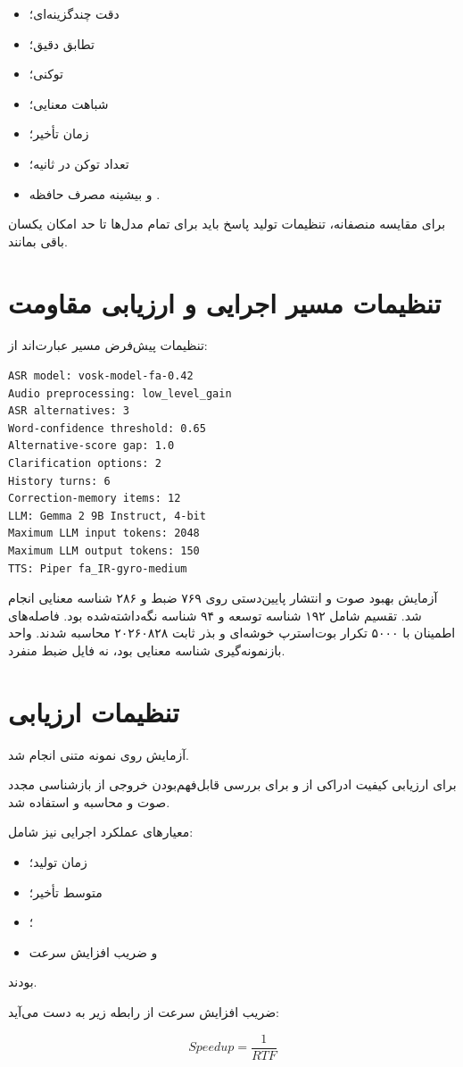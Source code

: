 \begin{itemize}
    \item دقت چندگزینه‌ای؛
    \item تطابق دقیق؛
    \item {} توکنی؛
    \item شباهت معنایی؛
    \item زمان تأخیر؛
    \item تعداد توکن در ثانیه؛
    \item و بیشینه مصرف حافظه .
\end{itemize}

برای مقایسه منصفانه، تنظیمات تولید پاسخ باید برای تمام مدل‌ها
تا حد امکان یکسان باقی بمانند.


\section{تنظیمات مسیر اجرایی و ارزیابی مقاومت}

تنظیمات پیش‌فرض مسیر  عبارت‌اند از:

\begin{latin}
\begin{verbatim}
ASR model: vosk-model-fa-0.42
Audio preprocessing: low_level_gain
ASR alternatives: 3
Word-confidence threshold: 0.65
Alternative-score gap: 1.0
Clarification options: 2
History turns: 6
Correction-memory items: 12
LLM: Gemma 2 9B Instruct, 4-bit
Maximum LLM input tokens: 2048
Maximum LLM output tokens: 150
TTS: Piper fa_IR-gyro-medium
\end{verbatim}
\end{latin}

آزمایش بهبود صوت و انتشار پایین‌دستی روی ۷۶۹ ضبط و ۲۸۶ شناسه
معنایی انجام شد. تقسیم  شامل ۱۹۲ شناسه توسعه و ۹۴
شناسه نگه‌داشته‌شده بود. فاصله‌های اطمینان با ۵۰۰۰ تکرار
بوت‌استرپ خوشه‌ای و بذر ثابت ۲۰۲۶۰۸۲۸ محاسبه شدند. واحد
بازنمونه‌گیری شناسه معنایی بود، نه فایل ضبط منفرد.


\section{تنظیمات ارزیابی }

آزمایش  روی
نمونه متنی انجام شد.

برای ارزیابی کیفیت ادراکی از  و برای بررسی
قابل‌فهم‌بودن خروجی از بازشناسی مجدد صوت و محاسبه  و 
استفاده شد.

معیارهای عملکرد اجرایی نیز شامل:

\begin{itemize}
    \item زمان تولید؛
    \item متوسط تأخیر؛
    \item {}؛
    \item و ضریب افزایش سرعت
\end{itemize}

بودند.

ضریب افزایش سرعت از رابطه زیر به دست می‌آید:

\begin{equation}
Speedup = \frac{1}{RTF}
\end{equation}
